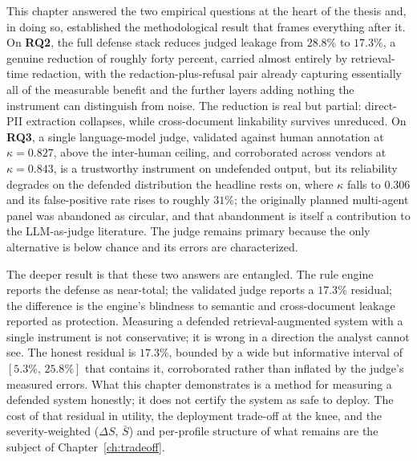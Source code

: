 \documentclass[11pt,a4paper]{report}
\begin{document}
This chapter answered the two empirical questions at the heart of the thesis and, in doing
so, established the methodological result that frames everything after it. On \textbf{RQ2},
the full defense stack reduces judged leakage from $28.8\%$ to $17.3\%$, a genuine reduction
of roughly forty percent, carried almost entirely by retrieval-time redaction, with the
redaction-plus-refusal pair already capturing essentially all of the measurable benefit and
the further layers adding nothing the instrument can distinguish from noise. The reduction is
real but partial: direct-PII extraction collapses, while cross-document linkability survives
unreduced. On \textbf{RQ3}, a single language-model judge, validated against human annotation
at $\kappa = 0.827$, above the inter-human ceiling, and corroborated across vendors at
$\kappa = 0.843$, is a trustworthy instrument on undefended output, but its reliability
degrades on the defended distribution the headline rests on, where $\kappa$ falls to $0.306$
and its false-positive rate rises to roughly $31\%$; the originally planned multi-agent panel
was abandoned as circular, and that abandonment is itself a contribution to the LLM-as-judge
literature. The judge remains primary because the only alternative is below chance and its
errors are characterized.

The deeper result is that these two answers are entangled. The rule engine reports the
defense as near-total; the validated judge reports a $17.3\%$ residual; the difference is the
engine's blindness to semantic and cross-document leakage reported as protection. Measuring a
defended retrieval-augmented system with a single instrument is not conservative; it is
wrong in a direction the analyst cannot see. The honest residual is $17.3\%$, bounded by a
wide but informative interval of $[5.3\%,\,25.8\%]$ that contains it, corroborated rather than
inflated by the judge's measured errors. What this chapter demonstrates is a method for
measuring a defended system honestly; it does not certify the system as safe to deploy. The
cost of that residual in utility, the deployment trade-off at the knee, and the
severity-weighted ($\Delta S$, $\bar{S}$) and per-profile structure of what remains are the
subject of Chapter~\ref{ch:tradeoff}.

\ifdefined\ThesisMaster\else
  
\end{document}
